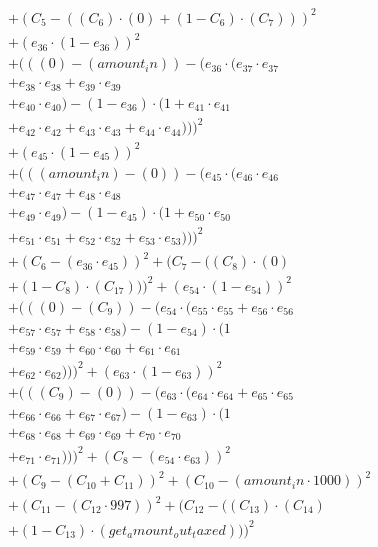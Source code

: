 \documentclass[10pt, a4paper]{article}
\begin{document}
\begin{align*}
& + (C_{5} - ((C_{6})  \cdot  (0) + (1 - C_{6})  \cdot  (C_{7})))^{2} \\
& + (e_{36} \cdot (1 - e_{36}))^{2} \\
& + (((0) - (amount_in)) - (e_{36} \cdot (e_{37} \cdot e_{37} \\
& + e_{38} \cdot e_{38} + e_{39} \cdot e_{39} \\
& + e_{40} \cdot e_{40}) - (1 - e_{36}) \cdot (1 + e_{41} \cdot e_{41} \\
& + e_{42} \cdot e_{42} + e_{43} \cdot e_{43} + e_{44} \cdot e_{44})))^{2} \\
& + (e_{45} \cdot (1 - e_{45}))^{2} \\
& + (((amount_in) - (0)) - (e_{45} \cdot (e_{46} \cdot e_{46} \\
& + e_{47} \cdot e_{47} + e_{48} \cdot e_{48} \\
& + e_{49} \cdot e_{49}) - (1 - e_{45}) \cdot (1 + e_{50} \cdot e_{50} \\
& + e_{51} \cdot e_{51} + e_{52} \cdot e_{52} + e_{53} \cdot e_{53})))^{2} \\
& + (C_{6} - (e_{36} \cdot e_{45}))^{2} + (C_{7} - ((C_{8})  \cdot  (0) \\
& + (1 - C_{8})  \cdot  (C_{17})))^{2} + (e_{54} \cdot (1 - e_{54}))^{2} \\
& + (((0) - (C_{9})) - (e_{54} \cdot (e_{55} \cdot e_{55} + e_{56} \cdot e_{56} \\
& + e_{57} \cdot e_{57} + e_{58} \cdot e_{58}) - (1 - e_{54}) \cdot (1 \\
& + e_{59} \cdot e_{59} + e_{60} \cdot e_{60} + e_{61} \cdot e_{61} \\
& + e_{62} \cdot e_{62})))^{2} + (e_{63} \cdot (1 - e_{63}))^{2} \\
& + (((C_{9}) - (0)) - (e_{63} \cdot (e_{64} \cdot e_{64} + e_{65} \cdot e_{65} \\
& + e_{66} \cdot e_{66} + e_{67} \cdot e_{67}) - (1 - e_{63}) \cdot (1 \\
& + e_{68} \cdot e_{68} + e_{69} \cdot e_{69} + e_{70} \cdot e_{70} \\
& + e_{71} \cdot e_{71})))^{2} + (C_{8} - (e_{54} \cdot e_{63}))^{2} \\
& + (C_{9} - (C_{10} + C_{11}))^{2} + (C_{10} - (amount_in  \cdot  1000))^{2} \\
& + (C_{11} - (C_{12}  \cdot  997))^{2} + (C_{12} - ((C_{13})  \cdot  (C_{14}) \\
& + (1 - C_{13})  \cdot  (get_amount_out_taxed)))^{2} \\

\end{align*}
\end{document}

